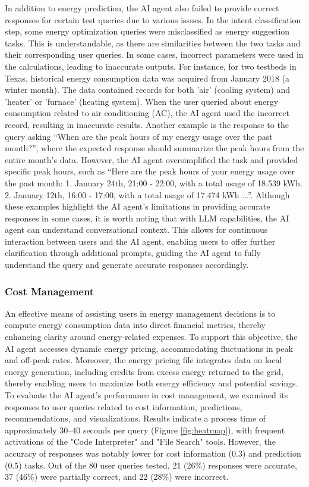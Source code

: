 \documentclass[final,3p,times]{elsarticle}
\begin{document}
In addition to energy prediction, the AI agent also failed to provide correct responses for certain test queries due to various issues. In the intent classification step, some energy optimization queries were misclassified as energy suggestion tasks. This is understandable, as there are similarities between the two tasks and their corresponding user queries. In some cases, incorrect parameters were used in the calculations, leading to inaccurate outputs. For instance, for two testbeds in Texas, historical energy consumption data was acquired from January 2018 (a winter month). The data contained records for both 'air' (cooling system) and 'heater' or 'furnace' (heating system). When the user queried about energy consumption related to air conditioning (AC), the AI agent used the incorrect record, resulting in inaccurate results. Another example is the response to the query asking “When are the peak hours of my energy usage over the past month?”, where the expected response should summarize the peak hours from the entire month's data. However, the AI agent oversimplified the task and provided specific peak hours, such as “Here are the peak hours of your energy usage over the past month: 1. January 24th, 21:00 - 22:00, with a total usage of 18.539 kWh. 2. January 12th, 16:00 - 17:00, with a total usage of 17.474 kWh ...”. Although these examples highlight the AI agent's limitations in providing accurate responses in some cases, it is worth noting that with LLM capabilities, the AI agent can understand conversational context. This allows for continuous interaction between users and the AI agent, enabling users to offer further clarification through additional prompts, guiding the AI agent to fully understand the query and generate accurate responses accordingly.



\subsubsection{Cost Management}

An effective means of assisting users in energy management decisions is to compute energy consumption data into direct financial metrics, thereby enhancing clarity around energy-related expenses. To support this objective, the AI agent accesses dynamic energy pricing, accommodating fluctuations in peak and off-peak rates. Moreover, the energy pricing file integrates data on local energy generation, including credits from excess energy returned to the grid, thereby enabling users to maximize both energy efficiency and potential savings. To evaluate the AI agent’s performance in cost management, we examined its responses to user queries related to cost information, predictions, recommendations, and visualizations. Results indicate a process time of approximately 30–40 seconds per query (Figure \ref{fig:heatmap}), with frequent activations of the "Code Interpreter" and "File Search" tools. However, the accuracy of responses was notably lower for cost information (0.3) and prediction (0.5) tasks. Out of the 80 user queries tested, 21 (26\%) responses were accurate, 37 (46\%) were partially correct, and 22 (28\%) were incorrect.
\end{document}
